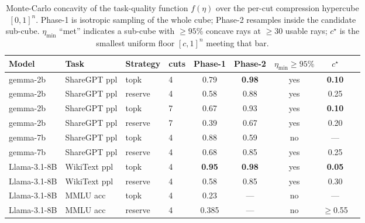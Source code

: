 
\begin{table}[t]
  \centering
  \caption{Monte-Carlo concavity of the task-quality function $f(\eta)$ over the
  per-cut compression hypercube $[0,1]^n$. Phase-1 is isotropic sampling of the
  whole cube; Phase-2 resamples inside the candidate sub-cube. $\eta_{\min}$
  ``met'' indicates a sub-cube with $\geq\!95\%$ concave rays at $\geq\!30$ usable
  rays; $c^\star$ is the smallest uniform floor $[c,1]^n$ meeting that bar.}
  \label{tab:mc-concavity}
  \begin{tabular}{llllccccc}
    \toprule
    Model & Task & Strategy & cuts & Phase-1 & Phase-2 & $\eta_{\min}\!\geq\!95\%$ & $c^\star$ \\
    \midrule
    gemma-2b     & ShareGPT ppl & topk    & 4 & 0.79          & \textbf{0.98} & yes & \textbf{0.10} \\
    gemma-2b     & ShareGPT ppl & reserve & 4 & 0.58          & 0.88          & yes & 0.25 \\
    gemma-2b     & ShareGPT ppl & topk    & 7 & 0.67          & 0.93          & yes & \textbf{0.10} \\
    gemma-2b     & ShareGPT ppl & reserve & 7 & 0.39          & 0.67          & yes & 0.20 \\
    gemma-7b     & ShareGPT ppl & topk    & 4 & 0.88          & 0.59          & no  & --- \\
    gemma-7b     & ShareGPT ppl & reserve & 4 & 0.68          & 0.85          & yes & 0.25 \\
    Llama-3.1-8B & WikiText ppl & topk    & 4 & \textbf{0.95} & \textbf{0.98} & yes & \textbf{0.05} \\
    Llama-3.1-8B & WikiText ppl & reserve & 4 & 0.58          & 0.85          & yes & 0.30 \\
    Llama-3.1-8B & MMLU acc     & topk    & 4 & 0.23          & ---           & no  & --- \\
    Llama-3.1-8B & MMLU acc     & reserve & 4 & 0.385         & ---           & no  & $\geq$0.55 \\
    \bottomrule
  \end{tabular}
\end{table}

